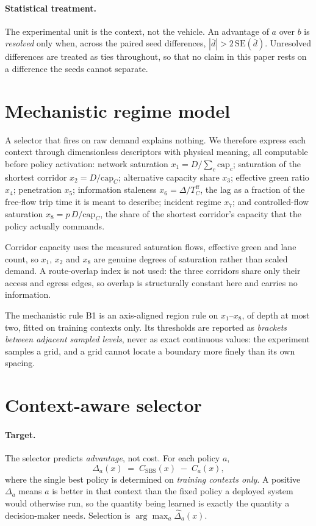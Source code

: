 \paragraph{Statistical treatment.} The experimental unit is the context, not
the vehicle. An advantage of $a$ over $b$ is \emph{resolved} only when, across
the paired seed differences, $|\overline{d}| > 2\,\mathrm{SE}(\overline{d})$.
Unresolved differences are treated as ties throughout, so that no claim in this
paper rests on a difference the seeds cannot separate.

\section{Mechanistic regime model}

A selector that fires on raw demand explains nothing. We therefore express each
context through dimensionless descriptors with physical meaning, all computable
before policy activation:
network saturation $x_1 = D/\sum_c \mathrm{cap}_c$;
saturation of the shortest corridor $x_2 = D/\mathrm{cap}_C$;
alternative capacity share $x_3$;
effective green ratio $x_4$;
penetration $x_5$;
information staleness $x_6 = \Delta / T^{\mathrm{ff}}_C$, the lag as a fraction
of the free-flow trip time it is meant to describe;
incident regime $x_7$; and
controlled-flow saturation $x_8 = p\,D/\mathrm{cap}_C$, the share of the
shortest corridor's capacity that the policy actually commands.

Corridor capacity uses the measured saturation flows, effective green and lane
count, so $x_1$, $x_2$ and $x_8$ are genuine degrees of saturation rather than
scaled demand. A route-overlap index is not used: the three corridors share only
their access and egress edges, so overlap is structurally constant here and
carries no information.

The mechanistic rule B1 is an axis-aligned region rule on $x_1$--$x_8$, of depth
at most two, fitted on training contexts only. Its thresholds are reported as
\emph{brackets between adjacent sampled levels}, never as exact continuous
values: the experiment samples a grid, and a grid cannot locate a boundary more
finely than its own spacing.

\section{Context-aware selector}

\paragraph{Target.} The selector predicts \emph{advantage}, not cost. For each
policy $a$,
\begin{equation}
\Delta_a(x) \;=\; C_{\mathrm{SBS}}(x) \;-\; C_a(x),
\end{equation}
where the single best policy is determined on \emph{training contexts only}.
A positive $\Delta_a$ means $a$ is better in that context than the fixed policy
a deployed system would otherwise run, so the quantity being learned is exactly
the quantity a decision-maker needs. Selection is $\arg\max_a \hat\Delta_a(x)$.

